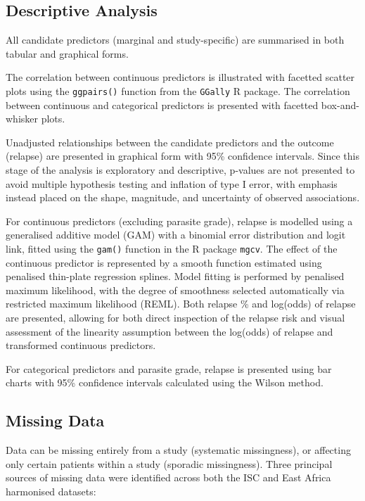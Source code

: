 \subsection{\label{sec:meth-desc}Descriptive Analysis}

All candidate predictors (marginal and study-specific) are summarised in both tabular and graphical forms.

The correlation between continuous predictors is illustrated with facetted scatter plots using the \texttt{ggpairs()} function from the \texttt{GGally} R package\cite{GGally2025}. The correlation between continuous and categorical predictors is presented with facetted box-and-whisker plots.

Unadjusted relationships between the candidate predictors and the outcome (relapse) are presented in graphical form with 95\% confidence intervals. Since this stage of the analysis is exploratory and descriptive, p-values are not presented to avoid multiple hypothesis testing and inflation of type I error, with emphasis instead placed on the shape, magnitude, and uncertainty of observed associations\cite{altman1986}.

For continuous predictors (excluding parasite grade), relapse is modelled using a generalised additive model (GAM) with a binomial error distribution and logit link, fitted using the \texttt{gam()} function in the R package \texttt{mgcv}\cite{wood2011}. The effect of the continuous predictor is represented by a smooth function estimated using penalised thin-plate regression splines. Model fitting is performed by penalised maximum likelihood, with the degree of smoothness selected automatically via restricted maximum likelihood (REML). Both relapse \% and log(odds) of relapse are presented, allowing for both direct inspection of the relapse risk and visual assessment of the linearity assumption between the log(odds) of relapse and transformed continuous predictors.

For categorical predictors and parasite grade, relapse is presented using bar charts with 95\% confidence intervals calculated using the Wilson method\cite{wilson1927}.

\subsection{\label{sec:meth-missing}Missing Data}

Data can be missing entirely from a study (systematic missingness), or affecting only certain patients within a study (sporadic missingness). Three principal sources of missing data were identified across both the ISC and East Africa harmonised datasets:

